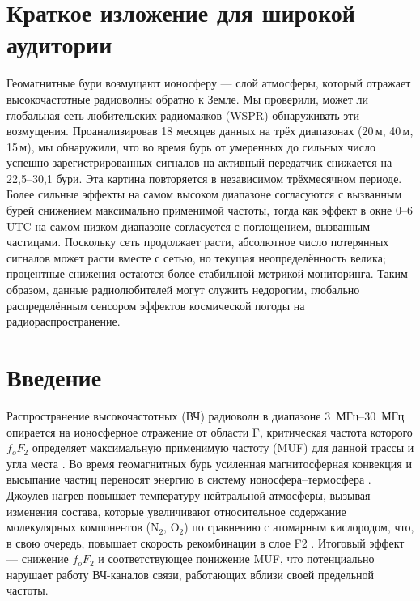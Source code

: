 \documentclass{agujournal2019}
\begin{document}
\section*{Краткое изложение для широкой аудитории}

Геомагнитные бури возмущают ионосферу — слой атмосферы, который отражает
высокочастотные радиоволны обратно к Земле. Мы проверили, может ли глобальная
сеть любительских радиомаяков (WSPR) обнаруживать эти возмущения. Проанализировав
18 месяцев данных на трёх диапазонах (20\,м, 40\,м, 15\,м), мы обнаружили,
что во время бурь от умеренных до сильных число успешно зарегистрированных
сигналов на активный передатчик снижается на 22,5--30,1 %
бури. Эта картина повторяется в независимом трёхмесячном периоде. Более
сильные эффекты на самом высоком диапазоне согласуются с вызванным бурей
снижением максимально применимой частоты, тогда как эффект в окне 0--6 UTC
на самом низком диапазоне согласуется с поглощением, вызванным частицами.
Поскольку сеть продолжает расти, абсолютное число потерянных сигналов может
расти вместе с сетью, но текущая неопределённость велика; процентные снижения
остаются более стабильной метрикой мониторинга. Таким образом, данные
радиолюбителей могут служить недорогим, глобально распределённым сенсором
эффектов космической погоды на радиораспространение.

\section{Введение}

Распространение высокочастотных (ВЧ) радиоволн в диапазоне
\SIrange{3}{30}{\mbox{МГц}} опирается на ионосферное отражение от области F,
критическая частота которого $f_oF_2$ определяет максимальную применимую
частоту (MUF) для данной трассы и угла места \citep{davies1990}. Во время
геомагнитных бурь усиленная магнитосферная конвекция и высыпание частиц
переносят энергию в систему ионосфера--термосфера
\citep{gonzalez1994,tsurutani2003}. Джоулев нагрев повышает температуру
нейтральной атмосферы, вызывая изменения состава, которые увеличивают
относительное содержание молекулярных компонентов (N$_2$, O$_2$) по
сравнению с атомарным кислородом, что, в свою очередь, повышает скорость
рекомбинации в слое F2 \citep{proelss1995}. Итоговый эффект — снижение
$f_oF_2$ и соответствующее понижение MUF, что потенциально нарушает работу
ВЧ-каналов связи, работающих вблизи своей предельной частоты.
\end{document}
